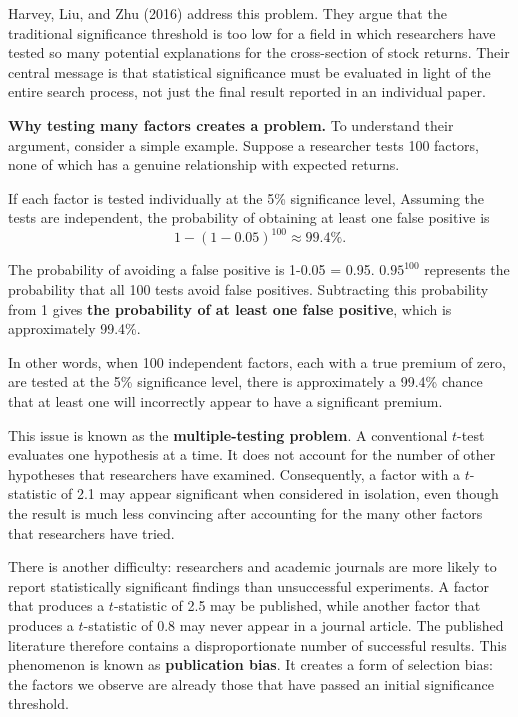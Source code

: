 Harvey, Liu, and Zhu (2016)
address this problem. They argue that the traditional significance
threshold is too low for a field in which researchers have tested
so many potential explanations for the cross-section of stock
returns. Their central message is that statistical significance
must be evaluated in light of the entire search process, not just
the final result reported in an individual paper.

\textbf{Why testing many factors creates a problem.}
To understand their argument, consider a simple example. Suppose
a researcher tests 100 factors, none of which has a genuine
relationship with expected returns. 

If each factor is tested
individually at the 5\% significance level, Assuming
the tests are independent, the probability of obtaining at least
one false positive is
\begin{equation}
  1-(1-0.05)^{100} \approx 99.4\%. \nonumber
\end{equation}

The probability of avoiding a false positive is 1-0.05 = 0.95. 
$0.95^{100}$ represents the probability that all 100 tests avoid false positives. 
Subtracting this probability from 1 gives \textbf{the probability of at least one false positive}, which is approximately 99.4\%.

In other words, when 100 independent factors, each with a true premium of zero, are tested at the 5\% significance level, 
there is approximately a 99.4\% 
chance that at least one will incorrectly appear to have a significant premium.

This issue is known as the \textbf{multiple-testing problem}.
 A conventional $t$-test
evaluates one hypothesis at a time. It does not account for the
number of other hypotheses that researchers have examined.
Consequently, a factor with a $t$-statistic of 2.1 may appear
significant when considered in isolation, even though the result
is much less convincing after accounting for the many other
factors that researchers have tried.

There is another difficulty: researchers and academic journals
are more likely to report statistically significant findings than
unsuccessful experiments. A factor that produces a $t$-statistic
of 2.5 may be published, while another factor that produces a
$t$-statistic of 0.8 may never appear in a journal article. The
published literature therefore contains a disproportionate
number of successful results. This phenomenon is known as
\textbf{publication bias}. It
creates a form of selection bias: the factors we observe are
already those that have passed an initial significance threshold.

